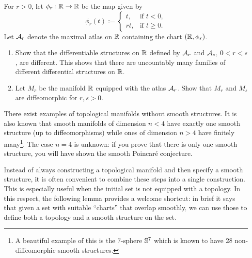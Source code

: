\begin{exercise}[\textit{[homework 1]}]
  For $r>0$, let $\phi_r:\mathbb{R}\to\mathbb{R}$ be the map given by
  \begin{equation}
    \phi_r(t) := \begin{cases}
      t, & \mbox{if } t<0,\\
      rt, & \mbox{if } t\geq0.
    \end{cases}
  \end{equation}
  Let $\mathcal{A}_r$ denote the maximal atlas on $\mathbb{R}$ containing the chart $(\mathbb{R}, \phi_r)$.
  \begin{enumerate}
    \item Show that the differentiable structures on $\mathbb{R}$ defined by $\mathcal{A}_r$ and $\mathcal{A}_s$, $0<r<s$, are different.
    This shows that there are uncountably many families of different differential structures on $\mathbb{R}$.
    \item Let $M_r$ be the manifold $\mathbb{R}$ equipped with the atlas $\mathcal{A}_r$.
    Show that $M_r$ and $M_s$ are diffeomorphic for $r,s >0$.
  \end{enumerate}
\end{exercise}

\begin{remark}
	There exist examples of topological manifolds without smooth structures.
	It is also known that smooth manifolds of dimension $n < 4$ have exactly one smooth structure (up to diffeomorphisms) while ones of dimension $n > 4$ have finitely many\footnote{A beautiful example of this is the $7$-sphere $\mathbb{S}^7$ which is known to have 28 non-diffeomorphic smooth structures.}.
	The case $n = 4$ is unknown: if you prove that there is only one smooth structure, you will have shown the smooth Poincar\'e conjecture.
\end{remark}

Instead of always constructing a topological manifold and then specify a smooth structure, it is often convenient to combine these steps into a single construction.
This is especially useful when the initial set is not equipped with a topology.
In this respect, the following lemma provides a welcome shortcut: in brief it says that given a set with suitable ``charts'' that overlap smoothly, we can use those to define both a topology and a smooth structure on the set.

